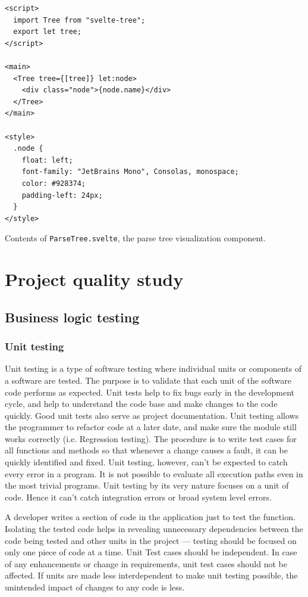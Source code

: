\documentclass[english,engineering]{wizthesis}
\newcommand{\paraphrase}[1]{#1}
\begin{document}
\begin{listing}[H]
  \begin{verbatim}
<script>
  import Tree from "svelte-tree";
  export let tree;
</script>

<main>
  <Tree tree={[tree]} let:node>
    <div class="node">{node.name}</div>
  </Tree>
</main>

<style>
  .node {
    float: left;
    font-family: "JetBrains Mono", Consolas, monospace;
    color: #928374;
    padding-left: 24px;
  }
</style>
  \end{verbatim}
  \caption{Contents of \texttt{ParseTree.svelte}, the parse tree visualization
  component.}
  \label{lst:svelte-parse-tree}
\end{listing}

\chapter{Project quality study} \label{ch:project-quality-study}

\section{Business logic testing} \label{sec:testing}

\subsection{Unit testing}

\paraphrase{Unit testing is a type of software testing where individual units or
components of a software are tested. The purpose is to validate that each unit
of the software code performs as expected. Unit tests help to fix bugs early in
the development cycle, and help to understand the code base and make changes to
the code quickly. Good unit tests also serve as project documentation. Unit
testing allows the programmer to refactor code at a later date, and make sure
the module still works correctly (i.e. Regression testing). The procedure is to
write test cases for all functions and methods so that whenever a change causes
a fault, it can be quickly identified and fixed. Unit testing, however, can't be
expected to catch every error in a program. It is not possible to evaluate all
execution paths even in the most trivial programs. Unit testing by its very
nature focuses on a unit of code. Hence it can't catch integration errors or
broad system level errors.

A developer writes a section of code in the application just to test the
function. Isolating the tested code helps in revealing unnecessary dependencies
between the code being tested and other units in the project --- testing should
be focused on only one piece of code at a time. Unit Test cases should be
independent. In case of any enhancements or change in requirements, unit test
cases should not be affected. If units are made less interdependent to make unit
testing possible, the unintended impact of changes to any code is less.}
\end{document}
